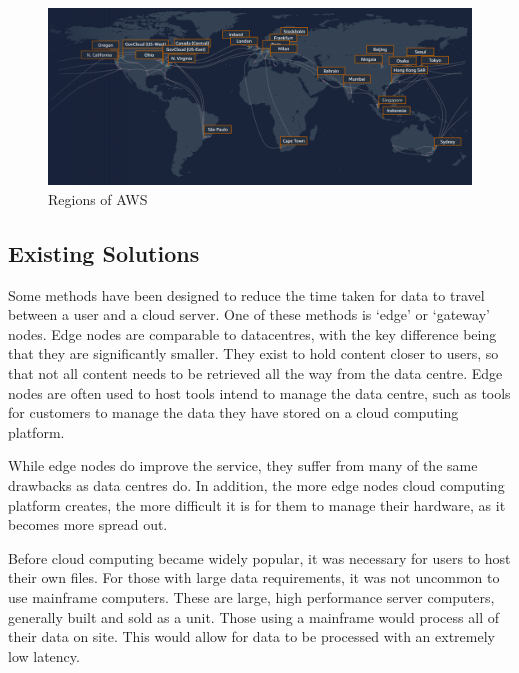 \begin{figure}[ht]
  \centering
  \includegraphics[width=\textwidth]{assets/aws_infrastructure.png}
  \caption{Regions of AWS}
  \label{aws_regions}
\end{figure}

\subsection{Existing Solutions}
\label{existing_solutions}


Some methods have been designed to reduce the time taken for data to travel between a user and a cloud server.
One of these methods is `edge' or `gateway' nodes.
Edge nodes are comparable to datacentres, with the key difference being that they are significantly smaller. They exist to hold content closer to users, so that not all content needs to be retrieved all the way from the data centre. Edge nodes are often used to host tools intend to manage the data centre, such as tools for customers to manage the data they have stored on a cloud computing platform.

While edge nodes do improve the service, they suffer from many of the same drawbacks as data centres do. In addition, the more edge nodes cloud computing platform creates, the more difficult it is for them to manage their hardware, as it becomes more spread out.

Before cloud computing became widely popular, it was necessary for users to host their own files. For those with large data requirements, it was not uncommon to use mainframe computers. These are large, high performance server computers, generally built and sold as a unit. Those using a mainframe would process all of their data on site. This would allow for data to be processed with an extremely low latency.

